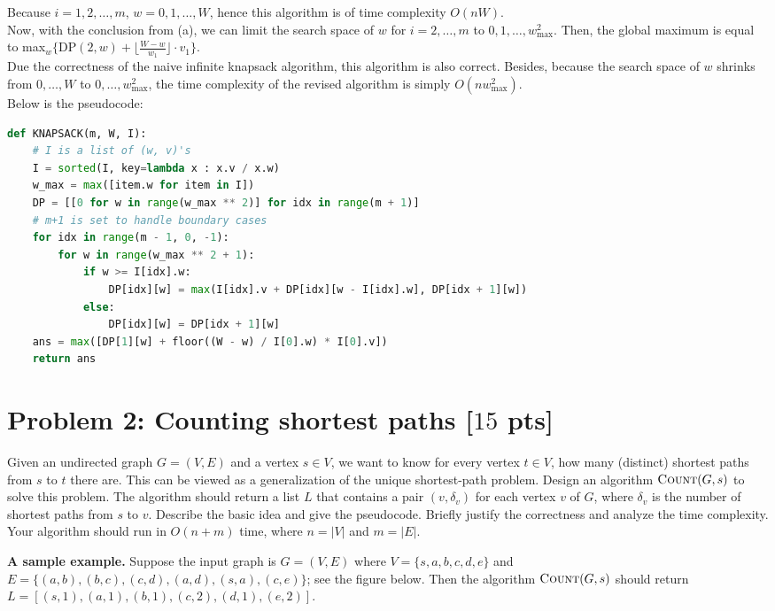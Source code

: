 \documentclass[11pt,twoside]{article}
\newcommand{\problem}[1]{\section*{Problem #1}}
\newenvironment{solution}{{\par\noindent\it Solution.}}{}
\begin{document}
\begin{solution}
Because $i=1,2,\dots,m$, $w=0,1,\dots,W$, hence this algorithm is of time complexity $O(nW)$.
\vspace{10pt}\\
Now, with the conclusion from (a), we can limit the search space of $w$ for $i=2,\dots,m$ to $0,1,\dots,w_{\text{max}}^2$.
Then, the global maximum is equal to max$_{w}\{\text{DP}(2,w)+\lfloor\frac{W-w}{w_1}\rfloor\cdot v_1\}$.
\vspace{10pt}\\
Due the correctness of the naive infinite knapsack algorithm, this algorithm is also correct.
Besides, because the search space of $w$ shrinks from $0,\dots,W$ to $0,\dots,w_{\text{max}}^2$,
the time complexity of the revised algorithm is simply $O(nw_{\text{max}}^2)$.
\vspace{10pt}\\
Below is the pseudocode:
\begin{lstlisting}[language=Python]
def KNAPSACK(m, W, I):
    # I is a list of (w, v)'s
    I = sorted(I, key=lambda x : x.v / x.w)
    w_max = max([item.w for item in I])
    DP = [[0 for w in range(w_max ** 2)] for idx in range(m + 1)] 
    # m+1 is set to handle boundary cases
    for idx in range(m - 1, 0, -1):
        for w in range(w_max ** 2 + 1):
            if w >= I[idx].w:
                DP[idx][w] = max(I[idx].v + DP[idx][w - I[idx].w], DP[idx + 1][w])
            else:
                DP[idx][w] = DP[idx + 1][w]
    ans = max([DP[1][w] + floor((W - w) / I[0].w) * I[0].v])
    return ans
\end{lstlisting}

\end{solution}

\problem{2: Counting shortest paths [$15$ pts]}
Given an undirected graph $G = (V,E)$ and a vertex $s \in V$, we want to know for every vertex $t \in V$, how many (distinct) shortest paths from $s$ to $t$ there are.
This can be viewed as a generalization of the unique shortest-path problem.
Design an algorithm $\textsc{Count}(G,s)$ to solve this problem.
The algorithm should return a list $L$ that contains a pair $(v,\delta_v)$ for each vertex $v$ of $G$, where $\delta_v$ is the number of shortest paths from $s$ to $v$.
Describe the basic idea and give the pseudocode.
Briefly justify the correctness and analyze the time complexity.
Your algorithm should run in $O(n+m)$ time, where $n = |V|$ and $m = |E|$.

\textbf{A sample example.}
Suppose the input graph is $G = (V,E)$ where $V = \{s,a,b,c,d,e\}$ and $E = \{(a,b),(b,c),(c,d),(a,d),(s,a),(c,e)\}$; see the figure below.
Then the algorithm $\textsc{Count}(G,s)$ should return $L = [(s,1),(a,1),(b,1),(c,2),(d,1),(e,2)]$.
\end{document}
